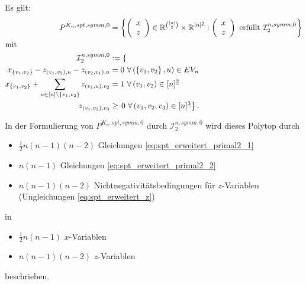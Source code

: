 \documentclass[10p,a4paper,BCOR = 12mm, DIV=15]{scrbook}
\begin{document}
{\begin{Le}
\label{le:spt_erweitert_dual2}
Es gilt:
\begin{align}
P^{K_n, spt, symm, 0} & = \left\{
\left(\begin{array}{c}
x \\
z
\end{array}\right)\in\mathbb{R}^{[n]\choose 2}\times \mathbb{R}^{[n]^{\underline{3}}}: \left(\begin{array}{c}
x \\
z
\end{array}\right)\textnormal{ erfüllt }\mathcal{I}^{n, symm, 0}_2\right\} \nonumber \\
\shortintertext{mit}
\mathcal{I}^{n, symm, 0}_2 & := \left\{ \right. \nonumber \\
x_{\left\{v_1, v_2\right\}} - z_{\left(v_1, v_2\right), u} - z_{\left(v_2, v_1\right), u} & = 0\ \forall \left(\left\{v_1, v_2\right\}, u\right)\in EV_n \label{eq:spt_erweitert_primal2_1} \\
x_{\left\{v_1, v_2\right\}} + \sum_{u\in[n]\backslash\left\{v_1, v_2\right\}} z_{\left(v_1, u\right), v_2} & = 1\ \forall \left(v_1, v_2\right)\in [n]^{\underline{2}} \label{eq:spt_erweitert_primal2_2} \\
z_{\left(v_1, v_2\right), v_3} & \geq \left.0\ \forall \left(v_1, v_2, v_3\right)\in [n]^{\underline{3}} \right\}. \label{eq:spt_erweitert_z}
\end{align}
\end{Le}

\begin{Bem}
\label{bem:spt_erweitert_dual2}
In der Formulierung von $P^{K_n, spt, symm, 0}$ durch $\mathcal{I}^{n, symm, 0}_2$ wird dieses Polytop durch
\begin{itemize}
\item $\frac{1}{2} n \left(n-1\right) \left(n-2\right)$ Gleichungen \eqref{eq:spt_erweitert_primal2_1}
\item $n \left(n-1\right)$ Gleichungen \eqref{eq:spt_erweitert_primal2_2}
\item $n \left(n-1\right) \left(n-2\right)$ Nichtnegativitätsbedingungen für $z$-Variablen (Ungleichungen \eqref{eq:spt_erweitert_z})
\end{itemize}
in
\begin{itemize}
\item $\frac{1}{2} n \left(n-1\right)$ $x$-Variablen
\item $n \left(n-1\right) \left(n-2\right)$ $z$-Variablen
\end{itemize}
beschrieben.
\end{Bem}

}
\end{document}
